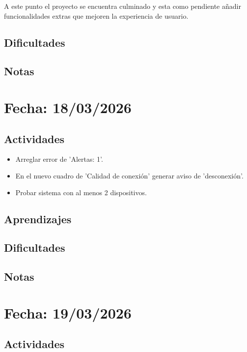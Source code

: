 \documentclass[12pt, a4paper]{article}
\begin{document}
    A este punto el proyecto se encuentra culminado y esta como pendiente añadir funcionalidades extras que mejoren la experiencia de usuario.

    \subsection*{Dificultades}

    \subsection*{Notas}

    \section*{Fecha: 18/03/2026}

    \subsection*{Actividades}

    \begin{itemize}
        \item Arreglar error de 'Alertas: 1'.
        \item En el nuevo cuadro de 'Calidad de conexión' generar aviso de 'desconexión'.
        \item Probar sistema con al menos 2 dispositivos.
    \end{itemize}

    \subsection*{Aprendizajes}

    \subsection*{Dificultades}

    \subsection*{Notas}

    \section*{Fecha: 19/03/2026}

    \subsection*{Actividades}
\end{document}

